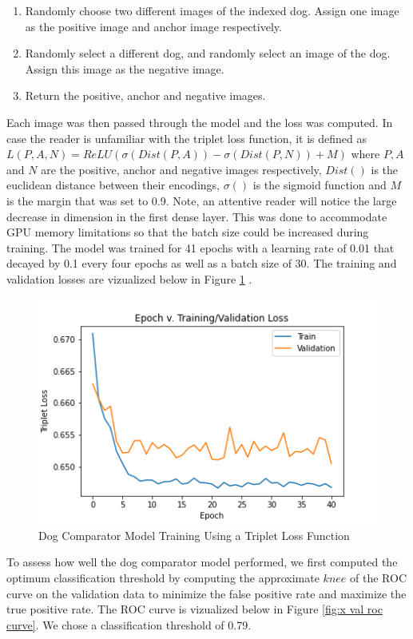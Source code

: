 \documentclass{article}
\begin{document}
    \begin{enumerate}
    
      \item Randomly choose two different images of the indexed dog.  Assign one image as the positive image and anchor image respectively. 
    
      \item Randomly select a different dog, and randomly select an image of the dog.  Assign this image as the negative image.
      
      \item Return the positive, anchor and negative images.
    
    \end{enumerate}

Each image was then passed through the model and the loss was computed.  In case the reader is unfamiliar with the triplet loss function,  it is defined as $L(P, A, N) = ReLU(\sigma(Dist(P, A)) - \sigma(Dist(P, N)) + M)$ where $P, A$ and $N$ are the positive, anchor and negative images respectively, $Dist()$ is the euclidean distance between their encodings, $\sigma()$ is the sigmoid function and $M$ is the margin that was set to 0.9.  Note, an attentive reader will notice the large decrease in dimension in the first dense layer.  This was done to accommodate GPU memory limitations so that the batch size could be increased during training.   The model was trained for 41 epochs with a learning rate of 0.01 that decayed by 0.1 every four epochs as well as a batch size of 30.  The training and validation losses are vizualized below in Figure \ref{fig:x epoch_v_map} .

\begin{figure}[h]
\centering
	\includegraphics[scale=0.7]{final-report-images/triplet_training.png}
\caption{Dog Comparator Model Training Using a Triplet Loss Function}
\label{fig:x epoch_v_map}
\end{figure}
To assess how well the dog comparator model performed, we first computed the optimum classification threshold by computing the approximate $knee$ of the ROC curve on the validation data to minimize the false positive rate and maximize the true positive rate.  The ROC curve is vizualized below in Figure \ref{fig:x val roc curve}.  We chose a classification threshold of 0.79.
\end{document}
